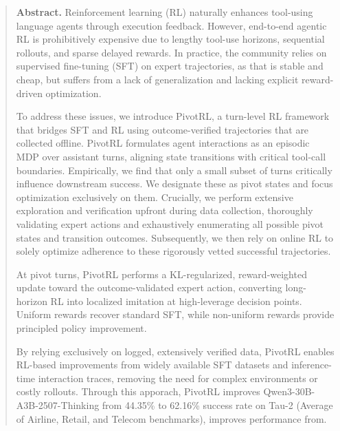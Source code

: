 \begin{abstract}
\large \textbf{Abstract.}
\normalsize
Reinforcement learning (RL) naturally enhances tool-using language agents through execution feedback. However, end-to-end agentic RL is prohibitively expensive due to lengthy tool-use horizons, sequential rollouts, and sparse delayed rewards. In practice, the community relies on supervised fine-tuning (SFT) on expert trajectories, as that is stable and cheap, but suffers from a lack of generalization and lacking explicit reward-driven optimization.

To address these issues, we introduce PivotRL, a turn-level RL framework that bridges SFT and RL using  outcome-verified trajectories that are collected offline. PivotRL formulates agent interactions as an episodic MDP over assistant turns, aligning state transitions with critical tool-call boundaries. Empirically, we find that only a small subset of turns critically influence downstream success. We designate these as pivot states and focus optimization exclusively on them. Crucially, we perform extensive exploration and verification upfront during data collection, thoroughly validating expert actions and exhaustively enumerating all possible pivot states and transition outcomes. Subsequently, we then rely on online RL to solely optimize adherence to these rigorously vetted successful trajectories.

At pivot turns, PivotRL performs a KL-regularized, reward-weighted update toward the outcome-validated expert action, converting long-horizon RL into localized imitation at high-leverage decision points. Uniform rewards recover standard SFT, while non-uniform rewards provide principled policy improvement.

By relying exclusively on logged, extensively verified data, PivotRL enables RL-based improvements from widely available SFT datasets and inference-time interaction traces, removing the need for complex environments or costly rollouts. Through this apporach, PivotRL improves Qwen3-30B-A3B-2507-Thinking from 44.35\% to 62.16\% success rate on Tau-2 (Average of Airline, Retail, and Telecom benchmarks), improves performance from.

\end{abstract}


